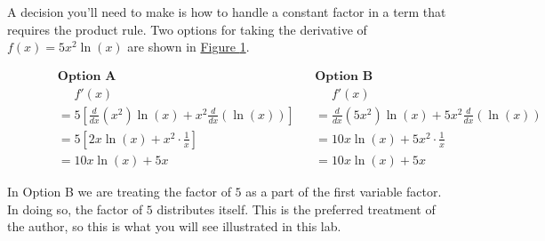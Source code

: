\documentclass[12pt,]{book}
\theoremstyle{plain}
\theoremstyle{definition}
\numberwithin{equation}{section}
\newcommand{\fe}[2]{#1\mathopen{}\left(#2\right)\mathclose{}}
\newcommand{\fd}[1]{#1'}
\newcommand{\lzoo}[2]{{\frac{d}{d#1}}{\left(#2\right)}}
\begin{document}
\par
A decision you'll need to make is how to handle a constant factor in a term that requires the product rule.  Two options for taking the derivative of \(\fe{f}{x}=5x^2\fe{\ln}{x}\) are shown in \hyperref[figure-constant-factors-with-product-rule]{Figure \ref{figure-constant-factors-with-product-rule}}.%
\begin{figure}
\centering
\begin{align*}
&\textbf{Option A}&&\textbf{Option B}\\
&\phantom{{}={}}\fe{\fd{f}}{x}&&\phantom{{}={}}\fe{\fd{f}}{x}\\
&=5\left[\lzoo{x}{x^2}\fe{\ln}{x}+x^2\lzoo{x}{\fe{\ln}{x}}\right]&&=\lzoo{x}{5x^2}\fe{\ln}{x}+5x^2\lzoo{x}{\fe{\ln}{x}}\\
&=5\left[2x\fe{\ln}{x}+x^2\cdot\frac{1}{x}\right]&&=10x\fe{\ln}{x}+5x^2\cdot\frac{1}{x}\\
&=10x\fe{\ln}{x}+5x&&=10x\fe{\ln}{x}+5x
\end{align*}%
\caption{\label{figure-constant-factors-with-product-rule}}
\end{figure}
\par
In Option B we are treating the factor of \(5\) as a part of the first variable factor.  In doing so, the factor of \(5\) distributes itself.  This is the preferred treatment of the author, so this is what you will see illustrated in this lab.%
\typeout{************************************************}
\typeout{************************************************}
\end{document}

